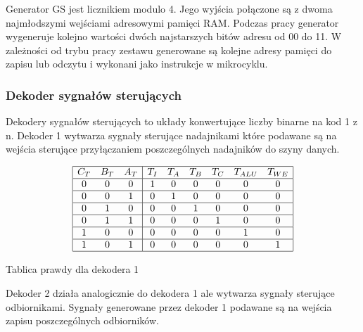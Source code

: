 \documentclass[../main.tex]{subfiles}
\begin{document}
        Generator GS jest licznikiem modulo 4. Jego wyjścia połączone są z dwoma najmłodszymi wejściami adresowymi pamięci RAM. Podczas pracy
        generator wygeneruje kolejno wartości dwóch najstarszych bitów adresu od 00 do 11. W zależności od trybu pracy zestawu generowane są
        kolejne adresy pamięci do zapisu lub odczytu i wykonani jako instrukcje w mikrocyklu.

        \subsubsection*{Dekoder sygnałów sterujących}
        
        Dekodery sygnałów sterujących to układy konwertujące liczby binarne na kod 1 z n. Dekoder 1 wytwarza sygnały sterujące nadajnikami które
        podawane są na wejścia sterujące przyłączaniem poszczególnych nadajników do szyny danych.

        \begin{table}[ht]
            \centering
            \[
            \begin{array}{|ccc|cccccc|}
            \hline
            C_T & B_T & A_T & T_I & T_A & T_B & T_C & T_{ALU} & T_{WE} \\ \hline
            0   & 0   & 0   & 1   & 0   & 0   & 0   & 0       & 0     \\ \hline
            0   & 0   & 1   & 0   & 1   & 0   & 0   & 0       & 0     \\ \hline
            0   & 1   & 0   & 0   & 0   & 1   & 0   & 0       & 0     \\ \hline
            0   & 1   & 1   & 0   & 0   & 0   & 1   & 0       & 0     \\ \hline
            1   & 0   & 0   & 0   & 0   & 0   & 0   & 1       & 0     \\ \hline
            1   & 0   & 1   & 0   & 0   & 0   & 0   & 0       & 1     \\ \hline
            \end{array}
            \]
            \caption{Tablica prawdy dla dekodera 1}
            \label{tab:nadajniki}
        \end{table}

        Dekoder 2 działa analogicznie do dekodera 1 ale wytwarza sygnały sterujące odbiornikami. Sygnały generowane przez dekoder 1 podawane
        są na wejścia zapisu poszczególnych odbiorników.
\end{document}

